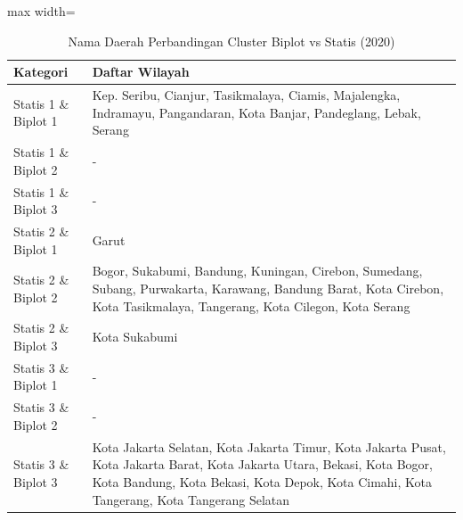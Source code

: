 \begin{table}[H]
\centering
\caption{Nama Daerah Perbandingan Cluster Biplot vs Statis (2020)} \label{tab:biplot_statis_name_2020}
\begin{adjustbox}{max width=\textwidth}
\begin{tabular}{|p{4cm}|p{10cm}|}
\hline
\textbf{Kategori} & \textbf{Daftar Wilayah} \\
\hline
Statis 1 \& Biplot 1 & Kep. Seribu, Cianjur, Tasikmalaya, Ciamis, Majalengka, Indramayu, Pangandaran, Kota Banjar, Pandeglang, Lebak, Serang \\
\hline
Statis 1 \& Biplot 2 & - \\
\hline
Statis 1 \& Biplot 3 & - \\
\hline
Statis 2 \& Biplot 1 & Garut \\
\hline
Statis 2 \& Biplot 2 & Bogor, Sukabumi, Bandung, Kuningan, Cirebon, Sumedang, Subang, Purwakarta, Karawang, Bandung Barat, Kota Cirebon, Kota Tasikmalaya, Tangerang, Kota Cilegon, Kota Serang \\
\hline
Statis 2 \& Biplot 3 & Kota Sukabumi \\
\hline
Statis 3 \& Biplot 1 & - \\
\hline
Statis 3 \& Biplot 2 & - \\
\hline
Statis 3 \& Biplot 3 & Kota Jakarta Selatan, Kota Jakarta Timur, Kota Jakarta Pusat, Kota Jakarta Barat, Kota Jakarta Utara, Bekasi, Kota Bogor, Kota Bandung, Kota Bekasi, Kota Depok, Kota Cimahi, Kota Tangerang, Kota Tangerang Selatan \\
\hline
\end{tabular}
\end{adjustbox}
\end{table}